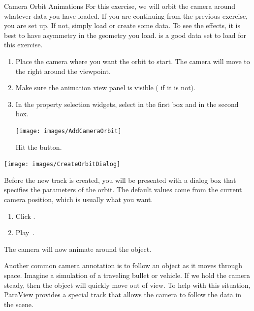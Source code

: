 \begin{exercise}{Camera Orbit Animations}
  \label{ex:CameraOrbitAnimations}%
  For this exercise, we will orbit the camera around whatever data you have
  loaded.  If you are continuing from the previous exercise, you are set
  up.  If not, simply load or create some data.  To see the effects, it is
  best to have asymmetry in the geometry you load.   is a good
  data set to load for this exercise.

  \begin{enumerate}
  \item Place the camera where you want the orbit to start.  The camera
    will move to the right around the viewpoint.
  \item Make sure the animation view panel is visible ( \ra
     if it is not).
  \item In the property selection widgets, select  in the first
    box and  in the second box.
    \begin{inlinefig}
      \texttt{[image: images/AddCameraOrbit]}
    \end{inlinefig}
    Hit the  button.
    \savecounter
  \end{enumerate}

  \begin{inlinefig}
    \texttt{[image: images/CreateOrbitDialog]}
  \end{inlinefig}

  Before the new track is created, you will be presented with a dialog box
  that specifies the parameters of the orbit.  The default values come from
  the current camera position, which is usually what you want.

  \begin{enumerate}
    \restorecounter
  \item Click .
  \item Play~\vcrPlay.
  \end{enumerate}

  The camera will now animate around the object.
\end{exercise}

Another common camera annotation is to follow an object as it moves
through space. Imagine a simulation of a traveling bullet or vehicle. If we
hold the camera steady, then the object will quickly move out of view. To
help with this situation, ParaView provides a special track that allows the
camera to follow the data in the scene.

